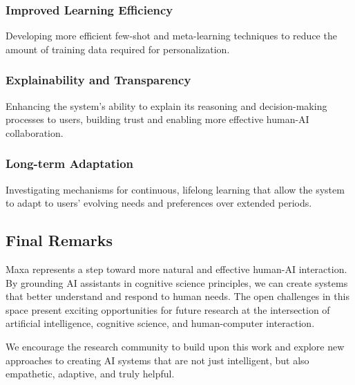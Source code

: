 \subsubsection{Improved Learning Efficiency}
Developing more efficient few-shot and meta-learning techniques to reduce the amount of training data required for personalization.

\subsubsection{Explainability and Transparency}
Enhancing the system's ability to explain its reasoning and decision-making processes to users, building trust and enabling more effective human-AI collaboration.

\subsubsection{Long-term Adaptation}
Investigating mechanisms for continuous, lifelong learning that allow the system to adapt to users' evolving needs and preferences over extended periods.

\subsection{Final Remarks}
Maxa represents a step toward more natural and effective human-AI interaction. By grounding AI assistants in cognitive science principles, we can create systems that better understand and respond to human needs. The open challenges in this space present exciting opportunities for future research at the intersection of artificial intelligence, cognitive science, and human-computer interaction.

We encourage the research community to build upon this work and explore new approaches to creating AI systems that are not just intelligent, but also empathetic, adaptive, and truly helpful.
